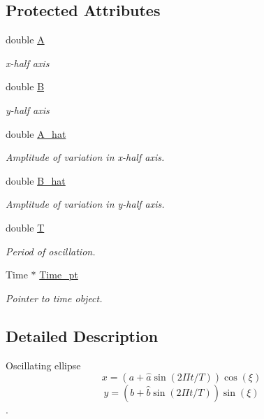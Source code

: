 \subsection*{Protected Attributes}
\begin{DoxyCompactItemize}
\item 
double \hyperlink{classMyEllipse_aa2a0efd0a39f9d4fc307a6ff011682ed}{A}
\begin{DoxyCompactList}\small\item\em x-\/half axis \end{DoxyCompactList}\item 
double \hyperlink{classMyEllipse_a8f991996b9040fe94b942eab7e51f0af}{B}
\begin{DoxyCompactList}\small\item\em y-\/half axis \end{DoxyCompactList}\item 
double \hyperlink{classMyEllipse_a653e71cf296cdc86cc595d16f18004dd}{A\+\_\+hat}
\begin{DoxyCompactList}\small\item\em Amplitude of variation in x-\/half axis. \end{DoxyCompactList}\item 
double \hyperlink{classMyEllipse_a39d06488447d80f16b80ed8915edf3e3}{B\+\_\+hat}
\begin{DoxyCompactList}\small\item\em Amplitude of variation in y-\/half axis. \end{DoxyCompactList}\item 
double \hyperlink{classMyEllipse_ab098069ab23bbbd8f30b0da3523dc87f}{T}
\begin{DoxyCompactList}\small\item\em Period of oscillation. \end{DoxyCompactList}\item 
Time $\ast$ \hyperlink{classMyEllipse_abc1c4c863a599ce87bdff1abb9971953}{Time\+\_\+pt}
\begin{DoxyCompactList}\small\item\em Pointer to time object. \end{DoxyCompactList}\end{DoxyCompactItemize}


\subsection{Detailed Description}
Oscillating ellipse \[ x = (a + \widehat{a} \sin(2\Pi t/T)) \cos(\xi) \] \[ y = (b + \widehat{b} \sin(2\Pi t/T)) \sin(\xi) \]. 

